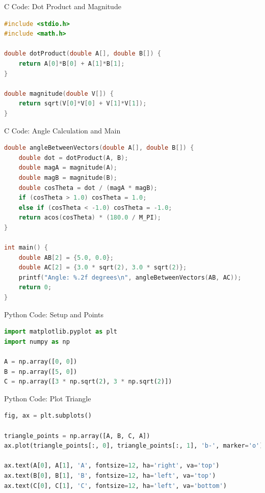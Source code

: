 \documentclass{beamer}
\begin{document}
\begin{frame}[fragile]{C Code: Dot Product and Magnitude}
\begin{lstlisting}[language=C]
#include <stdio.h>
#include <math.h>

double dotProduct(double A[], double B[]) {
    return A[0]*B[0] + A[1]*B[1];
}

double magnitude(double V[]) {
    return sqrt(V[0]*V[0] + V[1]*V[1]);
}
\end{lstlisting}
\end{frame}

\begin{frame}[fragile]{C Code: Angle Calculation and Main}
\begin{lstlisting}[language=C]
double angleBetweenVectors(double A[], double B[]) {
    double dot = dotProduct(A, B);
    double magA = magnitude(A);
    double magB = magnitude(B);
    double cosTheta = dot / (magA * magB);
    if (cosTheta > 1.0) cosTheta = 1.0;
    else if (cosTheta < -1.0) cosTheta = -1.0;
    return acos(cosTheta) * (180.0 / M_PI);
}

int main() {
    double AB[2] = {5.0, 0.0};
    double AC[2] = {3.0 * sqrt(2), 3.0 * sqrt(2)};
    printf("Angle: %.2f degrees\n", angleBetweenVectors(AB, AC));
    return 0;
}
\end{lstlisting}
\end{frame}

\begin{frame}[fragile]{Python Code: Setup and Points}
\begin{lstlisting}[language=Python]
import matplotlib.pyplot as plt
import numpy as np

A = np.array([0, 0])
B = np.array([5, 0])
C = np.array([3 * np.sqrt(2), 3 * np.sqrt(2)])
\end{lstlisting}
\end{frame}

\begin{frame}[fragile]{Python Code: Plot Triangle}
\begin{lstlisting}[language=Python]
fig, ax = plt.subplots()

triangle_points = np.array([A, B, C, A])
ax.plot(triangle_points[:, 0], triangle_points[:, 1], 'b-', marker='o')

ax.text(A[0], A[1], 'A', fontsize=12, ha='right', va='top')
ax.text(B[0], B[1], 'B', fontsize=12, ha='left', va='top')
ax.text(C[0], C[1], 'C', fontsize=12, ha='left', va='bottom')
\end{lstlisting}
\end{frame}
\end{document}
